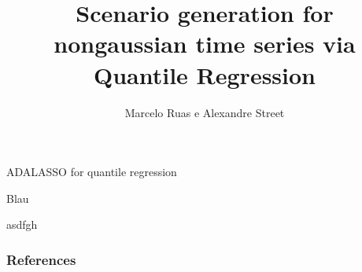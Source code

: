 \documentclass[11pt]{beamer}
\begin{document}
    \author{Marcelo Ruas e Alexandre Street}
    \title{Scenario generation for nongaussian time series via Quantile Regression}
    \begin{frame}[plain]
    \maketitle
    \end{frame}
    
    
    
    
    \begin{frame}{ADALASSO for quantile regression}
        
    
    Blau
    \cite{li_quantile_2007,moller_time-adaptive_2008,nielsen2006,bremnes_probabilistic_2004,gallego-castillo_-line_2016,wan_direct_2017,cai_regression_2002,koenker_quantile_2006,jiang_interquantile_2014,zou_regularized_2008,bergmeir_note_2017}

    asdfgh
    
    \end{frame}
    
    
    
    
    
    
    \begin{frame}[allowframebreaks]
            \small
            \frametitle{References}
            
              
    \end{frame}
    
    
\end{document}
